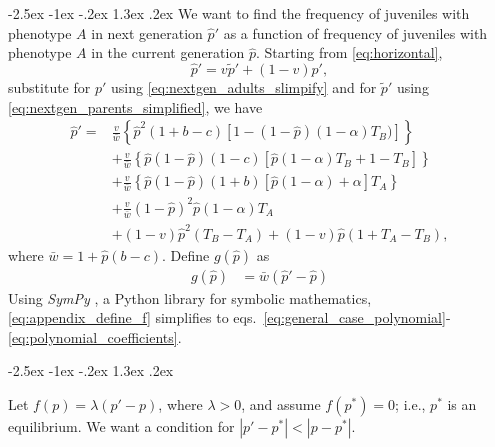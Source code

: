 \documentclass[12pt]{extarticle}
\makeatletter
\renewcommand\section{\@startsection {section}{1}{\z@}%
     {-2.5ex \@plus -1ex \@minus -.2ex}%
     {1.3ex \@plus.2ex}%
    {\Large\bfseries}}
\makeatother
\begin{document}
{\begin{appendices}
\section{} \label{sec:appendixA}
We want to find the frequency of juveniles with phenotype $A$ in next generation $\hat{p}'$ as a function of frequency
of juveniles with phenotype $A$ in the current generation $\hat{p}$.
Starting from \autoref{eq:horizontal},
\begin{equation}\label{eq:appendix_b_1}
  \hat{p}' = v \tilde{p}' + (1-v) p',
\end{equation}
 substitute for $p'$ using \autoref{eq:nextgen_adults_slimpify} and for $\tilde{p}'$ using \autoref{eq:nextgen_parents_simplified}, we have
\begin{equation}\label{eq:appendix_b_2}
  \begin{aligned}
  \hat{p}'  = & \frac{v}{\bar{w}}\left\{\hat{p}^2(1+b-c)\left[1-(1-\hat{p})(1-\alpha)T_B)\right]\right\} \\
  & + \frac{v}{\bar{w}}\left\{ \hat{p}(1-\hat{p})(1-c)\left[ \hat{p}(1-\alpha)T_B + 1 - T_B \right] \right\} \\
  & + \frac{v}{\bar{w}}\left\{ \hat{p}(1-\hat{p})(1+b)\left[\hat{p}(1-\alpha) + \alpha \right]T_A \right\} \\
  & + \frac{v}{\bar{w}}(1-\hat{p})^2\hat{p}(1-\alpha)T_A \\
  & + (1-v)\hat{p}^2(T_B-T_A) + (1-v)\hat{p}(1+T_A-T_B),
\end{aligned}
\end{equation}
where $\bar{w} = 1 + \hat{p}(b-c)$. 
Define $g(\hat{p})$ as
\begin{equation} \label{eq:appendix_define_f}
\begin{aligned}
      g(\hat{p}) &= \bar{w}(\hat{p}' - \hat{p})
\end{aligned}
\end{equation}
Using \emph{SymPy} \citep{Meurer2017}, a Python library for symbolic mathematics,  \autoref{eq:appendix_define_f} simplifies to 
eqs.~\ref{eq:general_case_polynomial}-\ref{eq:polynomial_coefficients}.

\section{} \label{sec:appendixB}

Let $f(p)=\lambda(p'-p)$, where $\lambda>0$, and assume $f(p^*)=0$; i.e., $p^*$ is an equilibrium.
We want a condition for $|p'-p^*| < |p-p^*|$.


\end{appendices}}
\end{document}
